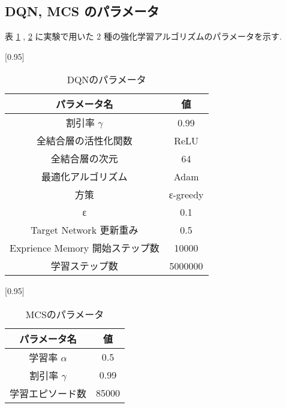 \documentclass[twocolumn]{jarticle}     %
\begin{document}
  \subsection{DQN, MCS のパラメータ}
  表 \ref{table:dqnparam} , \ref{table:mcsparam} に実験で用いた 2 種の強化学習アルゴリズムのパラメータを示す.
  \begin{table}[H]
    \centering
    \caption{DQNのパラメータ}
    \vspace{-0.3cm}
    \label{table:dqnparam}
    \scalebox{0.95}[0.95]{
      \begin{tabular}{|c|c|}
        \hline
        パラメータ名 & 値 \\ \hline \hline
        割引率 $\gamma$ & 0.99 \\ \hline     
        全結合層の活性化関数             & ReLU     \\ \hline
        全結合層の次元                & 64       \\ \hline
        最適化アルゴリズム              & Adam     \\ \hline
        方策                 & ε-greedy \\ \hline
        ε & 0.1 \\ \hline  
        Target Network 更新重み              & 0.5     \\ \hline
        Exprience Memory 開始ステップ数 & 10000 \\ \hline
        学習ステップ数 & 5000000 \\ \hline
        \end{tabular}
    }
    \end{table}
  
    \begin{table}[H]
      \centering
      \caption{MCSのパラメータ}
      \vspace{-0.3cm}
      \label{table:mcsparam}
      \scalebox{0.95}[0.95]{
        \begin{tabular}{|c|c|}
          \hline
          パラメータ名 & 値 \\ \hline \hline
          学習率 $\alpha$ & 0.5 \\ \hline
          割引率 $\gamma$ & 0.99 \\ \hline     
          学習エピソード数 & 85000 \\ \hline
    
          \end{tabular}
      }
      \end{table}
\end{document}
